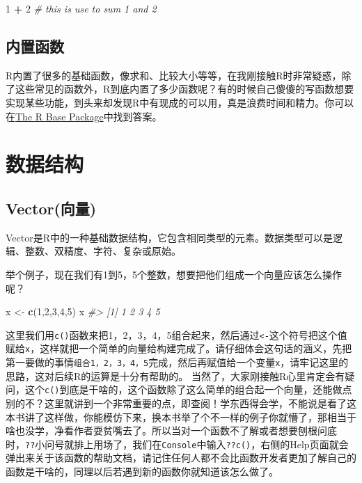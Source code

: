 \documentclass[
]{book}
\newenvironment{Shaded}{\begin{snugshade}}{\end{snugshade}}
\newcommand{\CommentTok}[1]{\textcolor[rgb]{0.56,0.35,0.01}{\textit{#1}}}
\newcommand{\DecValTok}[1]{\textcolor[rgb]{0.00,0.00,0.81}{#1}}
\newcommand{\FunctionTok}[1]{\textcolor[rgb]{0.13,0.29,0.53}{\textbf{#1}}}
\newcommand{\NormalTok}[1]{#1}
\newcommand{\OtherTok}[1]{\textcolor[rgb]{0.56,0.35,0.01}{#1}}
\newcommand{\SpecialCharTok}[1]{\textcolor[rgb]{0.81,0.36,0.00}{\textbf{#1}}}
\begin{document}
\begin{Shaded}
\begin{Highlighting}[]
\DecValTok{1} \SpecialCharTok{+} \DecValTok{2}    \CommentTok{\# this is use to sum 1 and 2}
\end{Highlighting}
\end{Shaded}

\hypertarget{ux5185ux7f6eux51fdux6570}{%
\section{内置函数}\label{ux5185ux7f6eux51fdux6570}}

R内置了很多的基础函数，像求和、比较大小等等，在我刚接触R时非常疑惑，除了这些常见的函数外，R到底内置了多少函数呢？有的时候自己傻傻的写函数想要实现某些功能，到头来却发现R中有现成的可以用，真是浪费时间和精力。你可以在\href{https://stat.ethz.ch/R-manual/R-devel/library/base/html/00Index.html}{The R Base Package}中找到答案。

\hypertarget{ux6570ux636eux7ed3ux6784}{%
\chapter{数据结构}\label{ux6570ux636eux7ed3ux6784}}

\hypertarget{vectorux5411ux91cf}{%
\section{Vector(向量)}\label{vectorux5411ux91cf}}

Vector是R中的一种基础数据结构，它包含相同类型的元素。数据类型可以是逻辑、整数、双精度、字符、复杂或原始。

举个例子，现在我们有1到5，5个整数，想要把他们组成一个向量应该怎么操作呢？

\begin{Shaded}
\begin{Highlighting}[]
\NormalTok{x }\OtherTok{\textless{}{-}} \FunctionTok{c}\NormalTok{(}\DecValTok{1}\NormalTok{,}\DecValTok{2}\NormalTok{,}\DecValTok{3}\NormalTok{,}\DecValTok{4}\NormalTok{,}\DecValTok{5}\NormalTok{)}
\NormalTok{x}
\CommentTok{\#\textgreater{} [1] 1 2 3 4 5}
\end{Highlighting}
\end{Shaded}

这里我们用\texttt{c()}函数来把1，2，3，4，5组合起来，然后通过\texttt{\textless{}-}这个符号把这个值赋给\texttt{x}，这样就把一个简单的向量给构建完成了。请仔细体会这句话的涵义，先把第一要做的事情\texttt{组合1，2，3，4，5}完成，然后再赋值给一个变量\texttt{x}，请牢记这里的思路，这对后续R的运算是十分有帮助的。
当然了，大家刚接触R心里肯定会有疑问，这个\texttt{c()}到底是干啥的，这个函数除了这么简单的组合起一个向量，还能做点别的不？这里就讲到一个非常重要的点，即查阅！学东西得会学，不能说是看了这本书讲了这样做，你能模仿下来，换本书举了个不一样的例子你就懵了，那相当于啥也没学，净看作者耍贫嘴去了。所以当对一个函数不了解或者想要刨根问底时，\texttt{??}小问号就排上用场了，我们在\texttt{Console}中输入\texttt{??c()}，右侧的Help页面就会弹出来关于该函数的帮助文档，请记住任何人都不会比函数开发者更加了解自己的函数是干啥的，同理以后若遇到新的函数你就知道该怎么做了。
\end{document}
